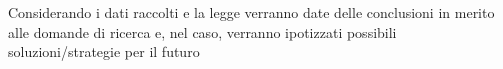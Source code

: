 Considerando i dati raccolti e la legge verranno date delle conclusioni in merito alle domande di ricerca e, nel caso, verranno ipotizzati possibili soluzioni/strategie per il futuro